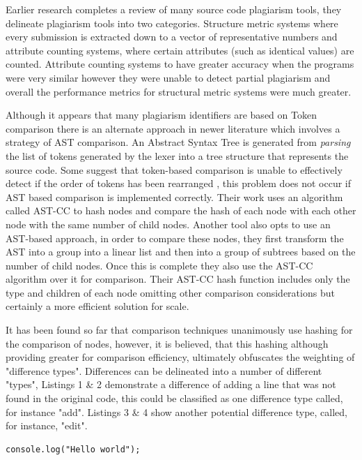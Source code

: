 \documentclass[jou,apacite]{apa6}
\begin{document}
Earlier research \cite{Lancaster2005} completes a review of many source code plagiarism tools, they delineate plagiarism tools into two categories. Structure metric systems where every submission is extracted down to a vector of representative numbers and attribute counting systems, where certain attributes (such as identical values) are counted. Attribute counting systems to have greater accuracy when the programs were very similar however they were unable to detect partial plagiarism and overall the performance metrics for structural metric systems were much greater. 

Although it appears that many plagiarism identifiers are based on Token comparison there is an alternate approach in newer literature which involves a strategy of AST comparison.  An Abstract Syntax Tree is generated from \textit{parsing} the list of tokens generated by the lexer into a tree structure that represents the source code. Some suggest that token-based comparison is unable to effectively detect if the order of tokens has been rearranged \cite{Feng2013}, this problem does not occur if AST based comparison is implemented correctly. Their work uses an algorithm called AST-CC to hash nodes and compare the hash of each node with each other node with the same number of child nodes. Another tool \cite{Zhao2015} also opts to use an AST-based approach, in order to compare these nodes, they first transform the AST into a group into a linear list and then into a group of subtrees based on the number of child nodes. Once this is complete they also use the AST-CC algorithm over it for comparison. Their AST-CC hash function includes only the type and children of each node omitting other comparison considerations but certainly a more efficient solution for scale.

It has been found so far that comparison techniques unanimously use hashing for the comparison of nodes, however, it is believed, that this hashing although providing greater for comparison efficiency, ultimately obfuscates the weighting of "difference types". Differences can be delineated into a number of different "types", Listings 1 \& 2 demonstrate a difference of adding a line that was not found in the original code, this could be classified as one difference type called, for instance "add".  Listings 3 \& 4 show another potential difference type, called, for instance, "edit".

\begin{lstlisting}[caption=Difference type add - A]
console.log("Hello world");
\end{lstlisting}
\end{document}
